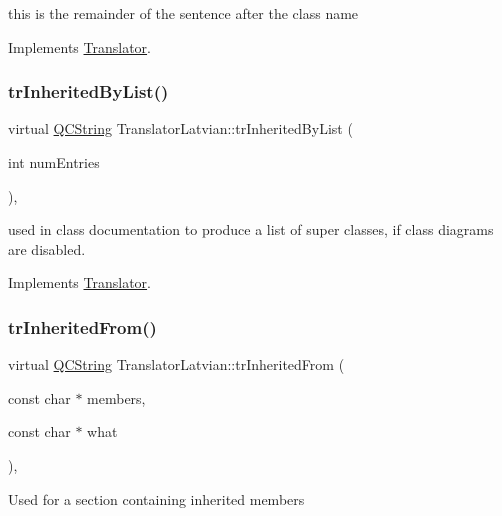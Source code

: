 this is the remainder of the sentence after the class name 

Implements \mbox{\hyperlink{class_translator}{Translator}}.

\mbox{\label{class_translator_latvian_a97b725795c862d1913a11bc9417834a8}} 
\subsubsection{\texorpdfstring{trInheritedByList()}{trInheritedByList()}}
{\footnotesize\ttfamily virtual \mbox{\hyperlink{class_q_c_string}{Q\+C\+String}} Translator\+Latvian\+::tr\+Inherited\+By\+List (\begin{DoxyParamCaption}\item[{int}]{num\+Entries }\end{DoxyParamCaption})\hspace{0.3cm}{\ttfamily [inline]}, {\ttfamily [virtual]}}

used in class documentation to produce a list of super classes, if class diagrams are disabled. 

Implements \mbox{\hyperlink{class_translator}{Translator}}.

\mbox{\label{class_translator_latvian_a40f2312e928c3fd8dbe8ec3e20dd38e0}} 
\subsubsection{\texorpdfstring{trInheritedFrom()}{trInheritedFrom()}}
{\footnotesize\ttfamily virtual \mbox{\hyperlink{class_q_c_string}{Q\+C\+String}} Translator\+Latvian\+::tr\+Inherited\+From (\begin{DoxyParamCaption}\item[{const char $\ast$}]{members,  }\item[{const char $\ast$}]{what }\end{DoxyParamCaption})\hspace{0.3cm}{\ttfamily [inline]}, {\ttfamily [virtual]}}

Used for a section containing inherited members 

